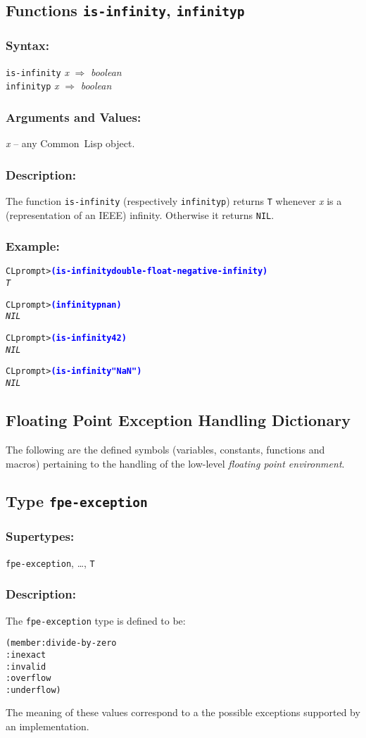 \documentclass[10pt,fleqn]{article}
\newcommand{\CL}{\textsf{Common~Lisp}}
\newcommand{\code}[1]{\texttt{#1}}
\newcommand{\clieeeterm}[1]{\textit{#1}}
\newcommand{\varname}[1]{\textit{#1}}
\newcommand{\codeprompt}[1]{\textcolor{blue}{\textbf{#1}}}
\newcommand{\DDictionaryItem}[1]{\vspace*{6pt}\noindent\hrulefill\vspace*{-9pt}\subsection*{#1}}
\newcommand{\DSyntax}{\subsubsection*{Syntax:}}
\newcommand{\DSupertypes}{\subsubsection*{Supertypes:}}
\newcommand{\DArgsNValues}{\subsubsection*{Arguments and Values:}}
\newcommand{\DDescription}{\subsubsection*{Description:}}
\begin{document}
\DDictionaryItem{Functions \code{is-infinity}, \code{infinityp}}

\DSyntax{}

\code{is-infinity} \varname{x} $\Rightarrow$ \textit{boolean}\\
\code{infinityp} \varname{x} $\Rightarrow$ \textit{boolean}

\DArgsNValues{}

\varname{x} -- any \CL{} object.

\DDescription{}

The function \code{is-infinity} (respectively \code{infinityp}) returns \code{T}
whenever \varname{x} is a (representation of an IEEE) infinity.  Otherwise
it returns \code{NIL}.


\subsubsection*{Example:}

\begin{alltt}
CL prompt> \codeprompt{(is-infinity double-float-negative-infinity)}
\textit{T}

CL prompt> \codeprompt{(infinityp nan)}
\textit{NIL}

CL prompt> \codeprompt{(is-infinity 42)}
\textit{NIL}

CL prompt> \codeprompt{(is-infinity "NaN")}
\textit{NIL}
\end{alltt}






\subsection{Floating Point Exception Handling Dictionary}
\label{sect:fpe-dictionary}

The following are the defined symbols (variables, constants, functions
and macros) pertaining to the handling of the low-level
\clieeeterm{floating point environment}.

\DDictionaryItem{Type \code{fpe-exception}}

\DSupertypes{}

\code{fpe-exception}, \ldots, \code{T}

\DDescription{}

The \code{fpe-exception} type is defined to be:
\begin{alltt}
(member :divide-by-zero
        :inexact
        :invalid
        :overflow
        :underflow)
\end{alltt}
The meaning of these values correspond to a the possible exceptions
supported by an implementation.
\end{document}
